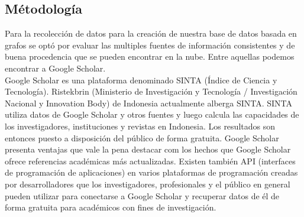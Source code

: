\subsection{Métodología}
Para la recolección de datos para la creación de nuestra base de datos basada en grafos se optó por evaluar las multiples fuentes de información consistentes y de buena procedencia que se pueden encontrar en la nube.
Entre aquellas podemos encontrar a Google Scholar.\\
Google Scholar es una plataforma denominado SINTA (Índice de Ciencia y Tecnología). Ristekbrin
(Ministerio de Investigación y Tecnología / Investigación Nacional y
Innovation Body) de Indonesia actualmente alberga SINTA.
SINTA utiliza datos de Google Scholar y otros
fuentes y luego calcula las capacidades de los investigadores,
instituciones y revistas en Indonesia. Los resultados son entonces
puesto a disposición del público de forma gratuita. Google Scholar
presenta ventajas que vale la pena destacar com los hechos que Google
Scholar ofrece referencias académicas más actualizadas. Existen
también API (interfaces de programación de aplicaciones) en varios
plataformas de programación creadas por desarrolladores que los investigadores,
profesionales y el público en general pueden utilizar para conectarse a
Google Scholar y recuperar datos de él de forma gratuita para académicos
con fines de investigación.
